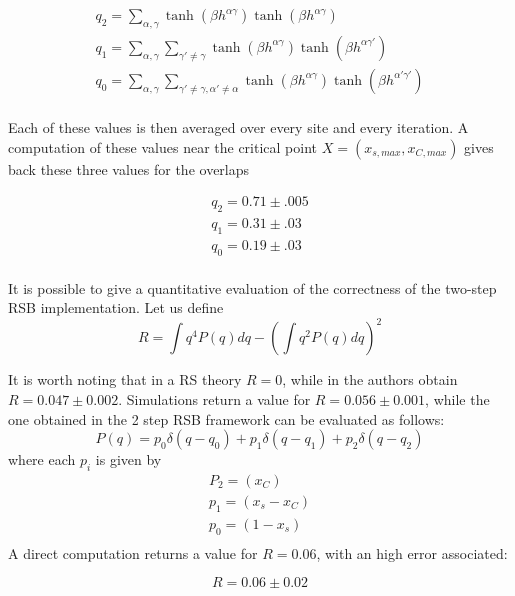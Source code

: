 \begin{eqnarray}
	q_2 = \sum_{\alpha, \gamma } \tanh(\beta h^{\alpha\gamma})\tanh(\beta h^{\alpha\gamma})  \\
	q_1 = \sum_{\alpha, \gamma} \sum_{\gamma' \neq \gamma } \tanh(\beta h^{\alpha\gamma})\tanh(\beta h^{\alpha\gamma'})  \\
	q_0 = \sum_{\alpha, \gamma} \sum_{\gamma' \neq \gamma, \alpha' \neq \alpha} \tanh(\beta h^{\alpha\gamma})\tanh(\beta h^{\alpha'\gamma'})  \\
\end{eqnarray}

Each of these values is then averaged over every site and every iteration.
A computation of these values near the critical point $X = (x_{s,max},x_{C,max})$ gives back these three values for the overlaps

\begin{eqnarray}
	q_2 = 0.71 \pm .005\nonumber \\
	q_1 = 0.31 \pm .03 \nonumber \\
	q_0 = 0.19 \pm .03 \nonumber \\
\end{eqnarray}

It is possible to give a quantitative evaluation of the correctness of the two-step RSB implementation. Let us define
\begin{equation}
R = \int q^4 P(q)dq - (\int q^2P(q)dq)^2
\label{erre}
\end{equation}

It is worth noting that in a RS theory $R=0$, while in \cite{bethe} the authors obtain $R = 0.047 \pm 0.002$. Simulations return a value for $R=0.056 \pm 0.001$, while the one obtained in the 2 step RSB framework can be evaluated as follows:
\begin{equation}
P(q) = p_0 \delta(q-q_0) + p_1 \delta(q-q_1) + p_2 \delta(q-q_2)
\end{equation}
where each $p_i$ is given by
\begin{eqnarray}
P_2 = (x_C) \nonumber \\
p_1 = (x_s - x_C) \nonumber \\
p_0 = (1 -  x_s)  \nonumber \\
\end{eqnarray}
A direct computation returns a value for $R =0.06$, with an high error associated:

\begin{equation}
                        R =0.06 \pm 0.02
\end{equation}

